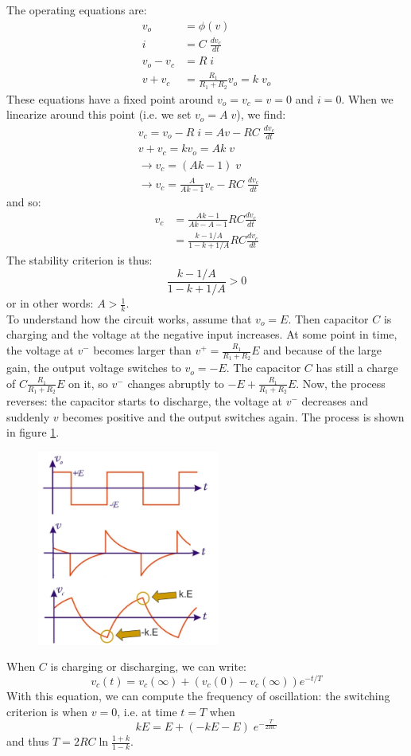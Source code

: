 The operating equations are:
\begin{align*}
	v_o &= \phi(v) \\ %
	i   &= C\;\frac{dv_c}{dt} \\
	v_o - v_c &= R\;i \\
	v + v_c &= \frac{R_1}{R_1 + R_2} v_o = k\; v_o
\end{align*}
These equations have a fixed point around $v_o = v_c = v = 0$ and $i=0$. When we linearize around this point (i.e. we set $v_o = A\; v$), we find:
\begin{align*}
	v_c = v_o - R\;i = A v - RC\;\frac{dv_c}{dt}\\
	v  + v_c = k v_o = Ak\; v \\
	\rightarrow v_c = (Ak - 1) \; v \\
	\rightarrow v_c = \frac{A}{Ak - 1} v_c - RC\; \frac{dv_c}{dt}
\end{align*}
and so:
\begin{align*}
	v_c &= \frac{Ak-1}{Ak-A-1} RC \frac{dv_c}{dt} \\
		&= \frac{k - 1/A}{1 - k + 1/A} RC \frac{dv_c}{dt}
\end{align*}
The stability criterion is thus:
$$
\frac{k - 1/A}{1 - k + 1/A} > 0
$$
or in other words: $A > \frac{1}{k}$.\\
To understand how the circuit works, assume that $v_o = E$. Then capacitor $C$ is charging and the voltage at the negative input increases. At some point in time, the voltage at $v^-$ becomes larger than $v^+ = \frac{R_1}{R_1 + R_2} E$ and because of the large gain, the output voltage switches to $v_o = -E$. The capacitor $C$ has still a charge of $C \frac{R_1}{R_1 + R_2} E $ on it, so $v^-$ changes abruptly to $ -E + \frac{R_1}{R_1 + R_2} E$. Now, the process reverses: the capacitor starts to discharge, the voltage at $v^-$ decreases and suddenly $v$ becomes positive and the output switches again. The process is shown in figure \ref{fig:relaxation4}.\\
\begin{figure}[h!]
	\centering
	\includegraphics[width=6cm]{figures/ch11/relaxation4.jpg}
	\caption{}
	\label{fig:relaxation4}
\end{figure}
When $C$ is charging or discharging, we can write:
$$
v_c(t) = v_c(\infty) + (v_c(0) - v_c(\infty)) e^{-t/T} 
$$
With this equation, we can compute the frequency of oscillation: the switching criterion is when $v=0$, i.e. at time $t=T$ when 
$$ kE = E + (-kE - E) \; e^{-\frac{T}{2RC}} $$
and thus $T = 2RC \ln \frac{1+k}{1-k}$.

